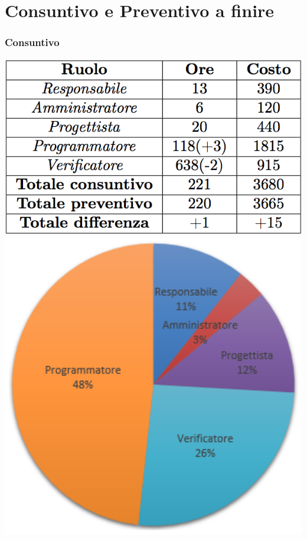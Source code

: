 \section{Consuntivo e Preventivo a finire}
\begin{frame}
  \frametitle{Consuntivo}
  \begin{center}
  	\includegraphics[scale=0.5]{img/prevCD}
  	\includegraphics[scale=0.4]{img/cakeCD}
  \end{center}
\end{frame}

